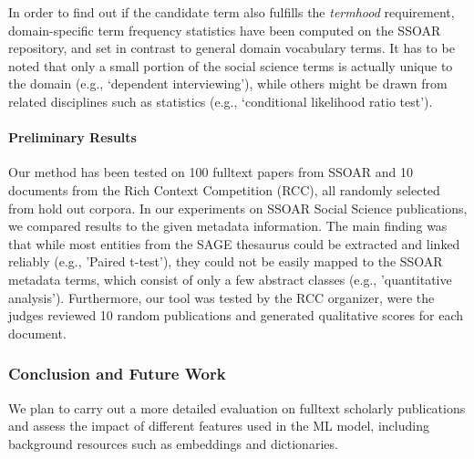In order to find out if the candidate term also fulfills the \textit{termhood} requirement, domain-specific term frequency statistics have been computed on the SSOAR repository, and set in contrast to general domain vocabulary terms. 
It has to be noted  that only a small portion of the social science terms is actually unique to the domain (e.g.,  `dependent interviewing'), while others might be drawn from related disciplines such as statistics (e.g., `conditional likelihood ratio test').


\paragraph{Preliminary Results}%
Our method has been tested on 100 fulltext papers from SSOAR and 10 documents from the Rich Context Competition (RCC), all randomly selected from hold out corpora.
In our experiments on SSOAR Social Science publications, we compared results to the given metadata information.
The main finding was that while most entities from the SAGE thesaurus could be extracted and linked reliably (e.g., 'Paired t-test'), they could not be easily mapped to the SSOAR metadata terms, which consist of only a few abstract classes (e.g., 'quantitative analysis'). Furthermore, our tool was tested by the RCC organizer, were the judges reviewed 10 random publications and generated qualitative scores for each document.  %

\subsubsection{Conclusion and Future Work}
\label{subsec:ner-conclusion}
We plan to carry out a more detailed evaluation on fulltext scholarly publications and assess the impact of different features used in the ML model, including  background resources such as embeddings and dictionaries. 
